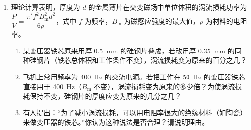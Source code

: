 \begin{enumerate}[label=\arabic*．,leftmargin=1.8em,itemsep=6pt,resume]
\item 理论计算表明，厚度为 $d$ 的金属薄片在交变磁场中单位体积的涡流损耗功率为 $\dfrac{P}{V}=\dfrac{\pi^2f^2B_{\mathrm m}^2d^2}{6\rho}$，式中 $f$ 为频率，$B_{\mathrm m}$ 为磁感应强度的最大值，$\rho$ 为材料的电阻率。
\begin{enumerate}[label=（\arabic*）,leftmargin=2.4em]
  \item 某变压器铁芯原来用厚 \qty{0.5}{mm} 的硅钢片叠成，若改用厚 \qty{0.35}{mm} 的同种硅钢片（铁芯总体积和工作条件不变），涡流损耗变为原来的百分之几？
  \item 飞机上常用频率为 \qty{400}{Hz} 的交流电源。若把工作在 \qty{50}{Hz} 的变压器铁芯直接用于 \qty{400}{Hz}（$B_{\mathrm m}$ 不变），涡流损耗变为原来的多少倍？为使涡流损耗保持不变，硅钢片的厚度应变为原来的几分之几？
  \item 有人提出：“为了减小涡流损耗，可以用电阻率很大的绝缘材料（如陶瓷）来做变压器的铁芯。”你认为这种说法是否合理？请说明理由。
\end{enumerate}
\liukong{5cm}

\end{enumerate}
